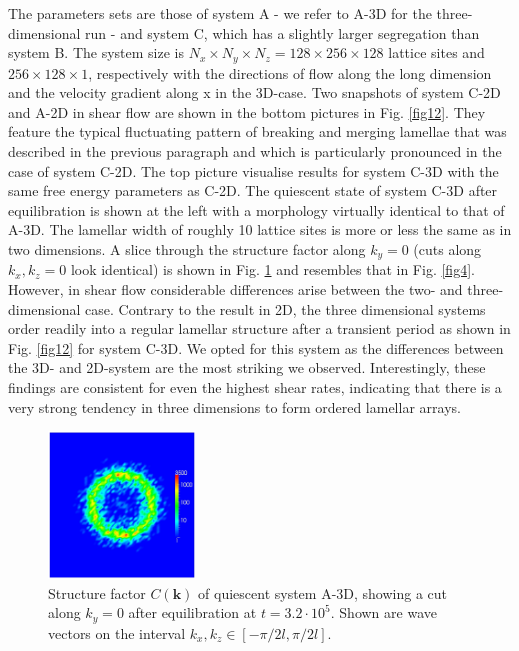 \documentclass[8.5pt,twoside,twocolumn]{article}
\newcommand{\e}[1]{\cdot10^{#1}}
\begin{document}
The parameters sets are those of system A - we refer to A-3D for the three-dimensional run - and system C, which has a slightly larger segregation than system B.
The system size is $N_x\times N_y \times N_z=128\times256\times128$ lattice sites and $256\times128\times1$, respectively with the directions of flow along the long dimension and the velocity gradient along x in the 3D-case. 
Two snapshots of system C-2D and A-2D in shear flow are shown in the bottom pictures in Fig. \ref{fig12}.
They feature the typical fluctuating pattern of breaking and merging lamellae that was described in the previous paragraph and which is particularly pronounced in the case of system C-2D.
The top picture visualise results for system C-3D with the same free energy parameters as C-2D.
The quiescent state of system C-3D after equilibration is shown at the left with a morphology virtually identical to that of A-3D.
The lamellar width of roughly 10 lattice sites is more or less the same as in two dimensions.
A slice through the structure factor along $k_y=0$ (cuts along $k_x,k_z=0$ look identical) is shown in Fig. \ref{fig13} and resembles that in Fig. \ref{fig4}.
However, in shear flow considerable differences arise between the two- and three-dimensional case.
Contrary to the result in 2D, the three dimensional systems order readily into a regular lamellar structure after a transient period as shown in Fig. \ref{fig12} for system C-3D. 
We opted for this system as the differences between the 3D- and 2D-system are the most striking we observed.
Interestingly, these findings are consistent for even the highest shear rates, indicating that there is a very strong tendency in three dimensions to form ordered lamellar arrays.

\begin{figure}[htp!]
\centering
\includegraphics[angle=0,width=0.35\textwidth]{ck_y-slice_run786_320.jpg}
\caption{Structure factor $C({\mathbf k})$ of quiescent system A-3D, showing a cut along $k_y=0$ after equilibration at $t=3.2\e{5}$. Shown are wave vectors on the interval $k_x, k_z\in[-\pi/2 l,\pi/2 l]$.}
\label{fig13}
\end{figure}
\end{document}
